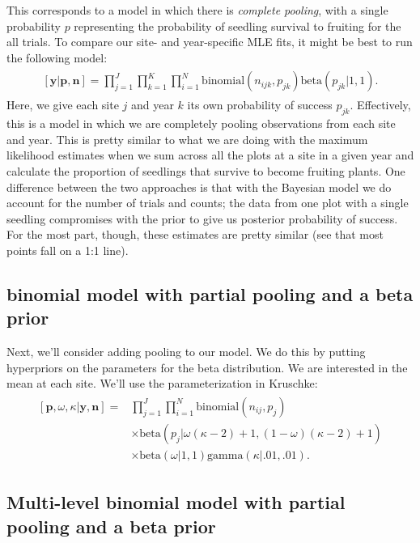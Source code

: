 \documentclass[12pt, oneside, titlepage]{article}   	%
\begin{document}
This corresponds to a model in which there is \textit{complete pooling}, with a single probability $p$ representing the probability of seedling survival to fruiting for the all trials. To compare our site- and year-specific MLE fits, it might be best to run the following model:
%
\begin{align}
  \begin{split}
[\bm{y}|\bm{p},\bm{n}]  = \prod_{j=1}^J\prod_{k=1}^K\prod_{i=1}^N \mathrm{binomial}(n_{ijk},p_{jk}) \mathrm{beta} (  p_{jk} | 1 , 1 ).
  \end{split}
\end{align}
Here, we give each site $j$ and year $k$ its own probability of success $p_{jk}$. Effectively, this is a model in which we are completely pooling observations from each site and year. This is pretty similar to what we are doing with the maximum likelihood estimates when we sum across all the plots at a site in a given year and calculate the proportion of seedlings that survive to become fruiting plants. One difference between the two approaches is that with the Bayesian model we do account for the number of trials and counts; the data from one plot with a single seedling compromises with the prior to give us posterior probability of success. For the most part, though, these estimates are pretty similar (see that most points fall on a 1:1 line).

\subsection*{binomial model with partial pooling and a beta prior}

Next, we'll consider adding pooling to our model. We do this by putting hyperpriors on the parameters for the beta distribution. We are interested in the mean at each site. We'll use the parameterization in Kruschke:
%
\begin{align}
  \begin{split}
[\bm{p},\omega,\kappa|\bm{y},\bm{n}]  = & \prod_{j=1}^J\prod_{i=1}^N \mathrm{binomial}(n_{ij},p_{j}) 
    \\ & \times \mathrm{beta} (  p_{j} | \omega(\kappa-2) +1 , (1-\omega) (\kappa -2) + 1) 
    \\ & \times \mathrm{beta} ( \omega | 1, 1) \mathrm{gamma} ( \kappa | .01, .01)  .
  \end{split}
\end{align}

\subsection*{Multi-level binomial model with partial pooling and a beta prior}
\end{document}
